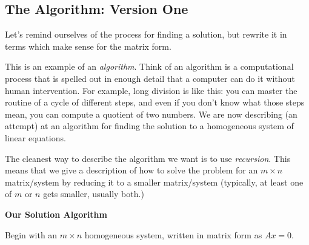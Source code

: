 \documentclass[elementsmain.tex]{subfiles}
\begin{document}
\subsection*{The Algorithm: Version One}

Let's remind ourselves of the process for finding a solution, but rewrite it in terms which make sense for the matrix form.

\begin{remark}[Algorithms]
This is an example of an \emph{algorithm}. Think of an algorithm is a computational process that is spelled out in enough detail that a computer can do it without human intervention. For example, long division is like this: you can master the routine of a cycle of different steps, and even if you don't know what those steps mean, you can compute a quotient of two numbers. We are now describing (an attempt) at an algorithm for finding the solution to a homogeneous system of linear equations.
\end{remark}

\begin{remark}[Recursion] The cleanest way to describe the algorithm we want is to use \emph{recursion}. This means that we give a description of how to solve the problem for an $m\times n$ matrix/system by reducing it to a smaller matrix/system (typically, at least one of $m$ or $n$ gets smaller, usually both.)\\
\end{remark}

\begin{center}
\textbf{Our Solution Algorithm}
\end{center}
Begin with an $m\times n$ homogeneous system, written in matrix form as $Ax=0$.
\end{document}
